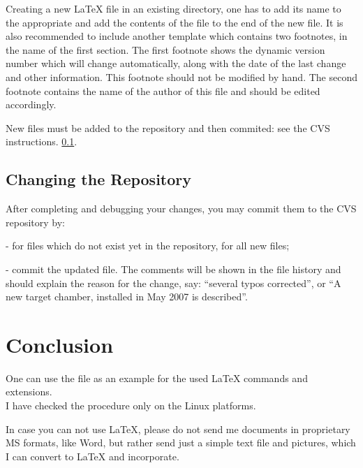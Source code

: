 \documentclass[12pt,letterpaper]{article}
\begin{document}
  Creating a new \LaTeX{} file in an existing directory,
  one has to add its name to the appropriate 
  and add the contents of the file 
  to the end of the new file. 
  It is also recommended to include another template 
  which contains two footnotes, in the name of the first section.
  The first footnote
  shows the dynamic version number which will change automatically, along
   with the date of the last change and other information. This footnote
   should not be modified by hand. The second footnote contains the name
   of the author of this file and should be edited accordingly.

   New files must be added to the repository and then commited:
   see the CVS instructions.
  \ref{sec:commit}.

\subsection{Changing the Repository}
\label{sec:commit}

  After completing and debugging your changes, you may commit them
  to the CVS repository by:\\
  \begin{list}{}{\setlength{\itemsep}{-0.15cm}}
    \item {} - for files which do not exist yet in the repository,
                                        for all new files;
    \item {} - commit the updated file.
          The comments will be shown in the file history and should explain the reason for the
          change, say: ``several typos corrected'', or ``A new target chamber, installed in May 2007 is described''.
  \end{list}

\section{Conclusion}
\label{sec:conclusion}

  One can use the file  as an
  example for the used \LaTeX{} commands and extensions. \\

  I have checked the procedure only on the Linux platforms.

  In case you can not use \LaTeX{},
  please do not send me documents in proprietary MS formats, like Word,
  but rather send just a simple text file and pictures, which I can
  convert to \LaTeX{} and incorporate. 




\end{document}
